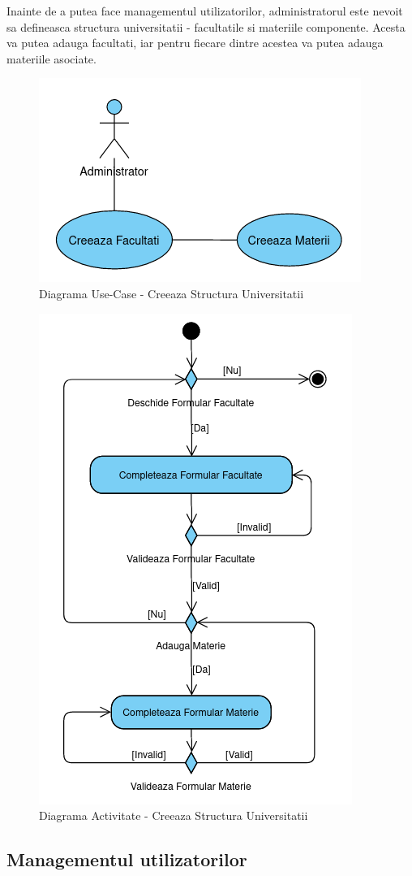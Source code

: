 \documentclass[12pt, a4paper, oneside, romanian]{teza-upb}
\begin{document}
Inainte de a putea face managementul utilizatorilor, administratorul este nevoit sa defineasca structura universitatii - facultatile si materiile componente. Acesta va putea adauga facultati, iar pentru fiecare dintre acestea va putea adauga materiile asociate.

\begin{figure}[H]
\centering
\includegraphics*[width=0.5\columnwidth]{diagrama-use-case-creeaza-structura-universitatii}
\caption{Diagrama Use-Case - Creeaza Structura Universitatii}
\label{diagrama-use-case-creeaza-structura-universitatii}
\end{figure}


\begin{figure}[H]
\centering
\includegraphics*[width=0.5\columnwidth]{diagrama-activitate-creeaza-structura-universitatii}
\caption{Diagrama Activitate - Creeaza Structura Universitatii}
\label{diagrama-activitate-creeaza-structura-universitatii}
\end{figure}

\subsection{Managementul utilizatorilor}
\end{document}
